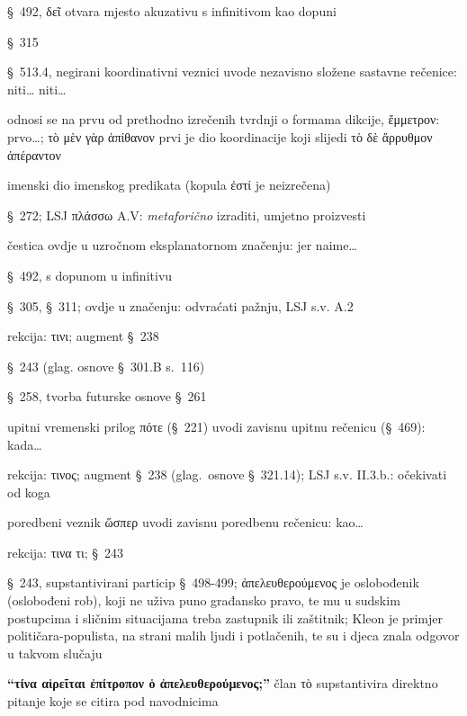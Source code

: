 \begin{description}[noitemsep]
\item[δεῖ] §~492, δεῖ otvara mjesto akuzativu s infinitivom kao dopuni
\item[εἶναι] §~315
\item[μήτε… μήτε] §~513.4, negirani koordinativni veznici uvode nezavisno složene sastavne rečenice: niti… niti…
\item[μὲν γὰρ ] odnosi se na prvu od prethodno izrečenih tvrdnji o formama dikcije, ἔμμετρον: prvo…; \textgreek[variant=ancient]{τὸ μὲν γὰρ ἀπίθανον} prvi je dio koordinacije koji slijedi \textgreek[variant=ancient]{τὸ δὲ ἄρρυθμον ἀπέραντον}
\item[ἀπίθανον] imenski dio imenskog predikata (kopula ἐστί je neizrečena)
\item[πεπλάσθαι] §~272; LSJ πλάσσω A.V: \textit{metaforično} izraditi, umjetno proizvesti
\item[γὰρ] čestica ovdje u uzročnom eksplanatornom značenju: jer naime…
\item[δοκεῖ] §~492, s dopunom u infinitivu
\item[ἐξίστησι] §~305, §~311; ovdje u značenju: odvraćati pažnju, LSJ s.v. A.2
\item[προσέχειν] rekcija: τινι; augment §~238
\item[ποιεῖ] §~243 (glag. osnove §~301.B s.~116)
\item[ἥξει] §~258, tvorba futurske osnove §~261
\item[πότε… ἥξει] upitni vremenski prilog πότε (§~221) uvodi zavisnu upitnu rečenicu (§~469): kada…
\item[προλαμβάνουσι ] rekcija: τινος; augment §~238 (glag.\ osnove §~321.14); LSJ s.v. II.3.b.: očekivati od koga
\item[ὥσπερ… προλαμβάνουσι] poredbeni veznik ὥσπερ uvodi zavisnu poredbenu rečenicu: kao\dots
\item[αἱρεῖται] rekcija: τινα τι; §~243
\item[ὁ ἀπελευθερούμενος] §~243, supstantivirani particip §~498-499; \textgreek[variant=ancient]{ἀπελευθερούμενος} je oslobođenik (oslobođeni rob), koji ne uživa puno građansko pravo, te mu u sudskim postupcima i sličnim situacijama treba zastupnik ili zaštitnik; Kleon je primjer političara-populista, na strani malih ljudi i potlačenih, te su i djeca znala odgovor u takvom slučaju
\item[τὸ] \textbf{\textgreek[variant=ancient]{“τίνα αἱρεῖται ἐπίτροπον ὁ ἀπελευθερούμενος;”}} član τὸ supstantivira direktno pitanje koje se citira pod navodnicima

\end{description}
